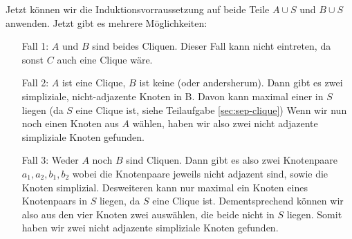 Jetzt können wir die Induktionsvorraussetzung auf beide Teile $A \cup S$ und $B \cup S$ anwenden.
Jetzt gibt es mehrere Möglichkeiten:

\begin{itemize}
    \item [Fall 1:] $A$ und $B$ sind beides Cliquen. Dieser Fall kann nicht eintreten, da sonst $C$ auch eine Clique wäre.
    \item [Fall 2:] $A$ ist eine Clique, $B$ ist keine (oder andersherum). Dann gibt es zwei simpliziale, nicht-adjazente Knoten in B. Davon kann maximal einer in $S$ liegen (da $S$ eine Clique ist, siehe Teilaufgabe \ref{sec:sep-clique})
    Wenn wir nun noch einen Knoten aus $A$ wählen, haben wir also zwei nicht adjazente simpliziale Knoten gefunden.
    \item [Fall 3:] Weder $A$ noch $B$ sind Cliquen. Dann gibt es also zwei Knotenpaare $a_1, a_2, b_1, b_2$ wobei die Knotenpaare jeweils nicht adjazent sind, sowie die Knoten simplizial. Desweiteren kann nur maximal ein Knoten eines Knotenpaars in $S$ liegen, da $S$ eine Clique ist.
    Dementsprechend können wir also aus den vier Knoten zwei auswählen, die beide nicht in $S$ liegen. Somit haben wir zwei nicht adjazente simpliziale Knoten gefunden.
\end{itemize}


